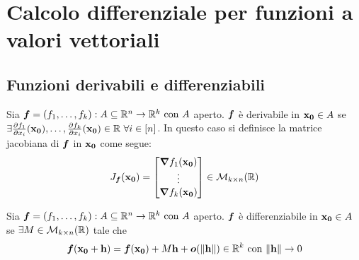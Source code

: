 \chapter{Calcolo differenziale per funzioni a valori vettoriali}

\section{Funzioni derivabili e differenziabili}

\begin{definition}
    Sia $\bm f=(f_1,\dots,f_k): A\subseteq \mathbb{R}^n \to \mathbb{R}^k \text{ con } A$ aperto. $\bm f$ è derivabile in $\vb{x_0} \in A$ se $\exists \frac{\partial f_1}{\partial x_i}(\vb{x_0}),\dots,\frac{\partial f_k}{\partial x_i}(\vb{x_0}) \in \mathbb{R} \ \forall i \in [n]$. In questo caso si definisce la matrice jacobiana di $\bm f$ in $\vb{x_0}$ come segue:
    \begin{equation*}
        J_{\bm f}(\vb{x_0})=
        \begin{bmatrix}
            \grad f_1 (\vb{x_0})\\
            \vdots \\
            \grad f_k (\vb{x_0})
        \end{bmatrix}
        \in \mathcal{M}_{k\times n}(\mathbb{R})
    \end{equation*}
\end{definition}

\begin{definition}
    Sia $\bm f=(f_1,\dots,f_k): A\subseteq \mathbb{R}^n \to \mathbb{R}^k \text{ con } A$ aperto. $\bm f$ è differenziabile in $\vb{x_0} \in A$ se $\exists M \in \mathcal{M}_{k\times n}(\mathbb{R})$ tale che
    \begin{equation*}
        \bm f(\vb{x_0} + \vb{h})= \bm f(\vb{x_0}) + M\vb{h} + \bm o (\norm{\vb{h}}) \in \mathbb{R}^k \text{ con } \norm{\vb{h}}\to 0
    \end{equation*}
\end{definition}

